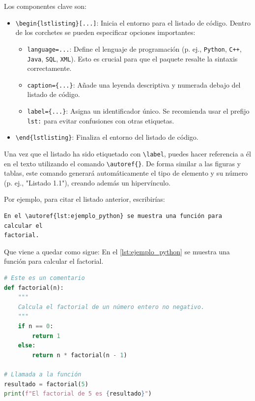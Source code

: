 \documentclass[11pt,a4paper]{book}
\begin{document}
Los componentes clave son:
\begin{itemize}
    \item \verb|\begin{lstlisting}[...]|: Inicia el entorno para el listado de código. Dentro de los corchetes se pueden especificar opciones importantes:
    \begin{itemize}
        \item \verb|language=...|: Define el lenguaje de programación (p. ej., \texttt{Python}, \texttt{C++}, \texttt{Java}, \texttt{SQL}, \texttt{XML}). Esto es crucial para que el paquete resalte la sintaxis correctamente.
        \item \verb|caption={...}|: Añade una leyenda descriptiva y numerada debajo del listado de código.
        \item \verb|label={...}|: Asigna un identificador único. Se recomienda usar el prefijo \texttt{lst:} para evitar confusiones con otras etiquetas.
    \end{itemize}
    \item \verb|\end{lstlisting}|: Finaliza el entorno del listado de código.
\end{itemize}

Una vez que el listado ha sido etiquetado con \verb|\label|, puedes hacer referencia a él en el texto utilizando el comando \verb|\autoref{}|. De forma similar a las figuras y tablas, este comando generará automáticamente el tipo de elemento y su número (p. ej., "Listado 1.1"), creando además un hipervínculo.

Por ejemplo, para citar el listado anterior, escribirías:
\begin{verbatim}
En el \autoref{lst:ejemplo_python} se muestra una función para calcular el 
factorial.
\end{verbatim}

Que viene a quedar como sigue: En el \autoref{lst:ejemplo_python} se muestra una función para calcular el factorial.

\begin{lstlisting}[language=Python, caption={Ejemplo de un listado de código en Python.}, label={lst:ejemplo_python}]
# Este es un comentario
def factorial(n):
    """
    Calcula el factorial de un número entero no negativo.
    """
    if n == 0:
        return 1
    else:
        return n * factorial(n - 1)

# Llamada a la función
resultado = factorial(5)
print(f"El factorial de 5 es {resultado}")
\end{lstlisting}
\end{document}
